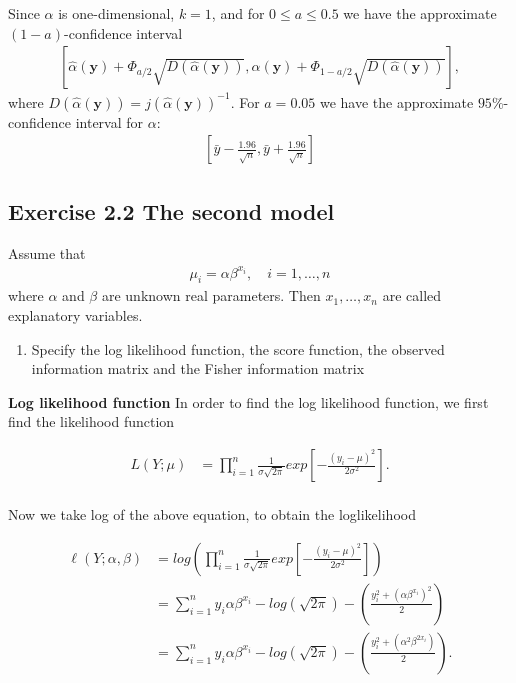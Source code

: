 Since $\alpha$ is one-dimensional, $k=1$, and for $0\leq a \leq 0.5$ we have the approximate $(1-a)$-confidence interval
\begin{align*}
\left[ \hat{\alpha}(\mathbf{y}) + \Phi_{a/2} \sqrt{D\left( \hat{\alpha}\left(\mathbf{y}\right)\right)}, \hat{\alpha}(\mathbf{y}) + \Phi_{1 - a/2} \sqrt{D\left( \hat{\alpha}\left(\mathbf{y}\right)\right)} \right],
\end{align*}
where $D\left(\hat{\alpha}(\mathbf{y})\right) = j\left(\hat{\alpha}(\mathbf{y})\right)^{-1}$.
For $a=0.05$ we have the approximate $95\%$-confidence interval for $\alpha$:
\begin{align*}
\left[ \bar{y} - \frac{1.96}{\sqrt{n}}, \bar{y} + \frac{1.96}{\sqrt{n}} \right]    
\end{align*}

\subsection*{Exercise 2.2 The second model}

Assume that
\begin{align*}
    \mu_i=\alpha \beta^{x_i}, \quad i=1,\ldots, n
\end{align*}
where $\alpha$ and $\beta$ are unknown real parameters. Then $x_1, \ldots,x_n$ are called explanatory variables. 

\begin{enumerate}
    \item Specify the log likelihood function, the score function, the observed information matrix and the Fisher information matrix
\end{enumerate}

\textbf{Log likelihood function}
In order to find the log likelihood function, we first find the likelihood function

\begin{align*}
   L(Y;\mu) &= \prod_{i=1}^n \frac{1}{\sigma \sqrt{2 \pi}}exp\left[-\frac{(y_i -\mu)^2}{2 \sigma^2}\right].\\
\end{align*}

Now we take log of the above equation, to obtain the loglikelihood

\begin{align*}
   \ell(Y;\alpha, \beta) &= log \left( \prod_{i=1}^n \frac{1}{\sigma \sqrt{2 \pi}}exp\left[-\frac{(y_i -\mu)^2}{2 \sigma^2}\right] \right)\\
   &= \sum_{i = 1}^n y_i \alpha \beta^{x_i} - log\left( \sqrt{2 \pi}\right) - \left( \frac{y_i^2 + (\alpha \beta^{x_i})^2}{2} \right)\\
   &=\sum_{i = 1}^n y_i \alpha \beta^{x_i} - log\left( \sqrt{2 \pi}\right) - \left( \frac{y_i^2 + (\alpha^2 \beta^{2x_i})}{2} \right).\\
\end{align*}

